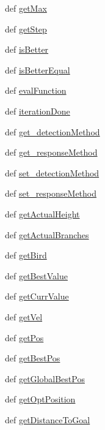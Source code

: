 \begin{CompactItemize}
\item 
def \hyperlink{classpso_1_1PSO_c0a0b2d00975cc0c7c3a0ade010a0dfb}{getMax}
\item 
def \hyperlink{classpso_1_1PSO_fa63468339a1f1b61bb08fdac78533c8}{getStep}
\item 
def \hyperlink{classpso_1_1PSO_720426c56c3c40a7aeb7025a9139742f}{isBetter}
\item 
def \hyperlink{classpso_1_1PSO_3c529903fe714d9e6c5fe0f8d31891ac}{isBetterEqual}
\item 
def \hyperlink{classpso_1_1PSO_43d5c6fb841788547e854e96785c4556}{evalFunction}
\item 
def \hyperlink{classpso_1_1PSO_a24e4aaf3ed6ca00076bb4b979cc402a}{iterationDone}
\item 
def \hyperlink{classpso_1_1PSO_9aa3d6d58e2708d1c386c8d23815df73}{get\_\-detectionMethod}
\item 
def \hyperlink{classpso_1_1PSO_5fd90d626508d95f3107b18bb8fcd74b}{get\_\-responseMethod}
\item 
def \hyperlink{classpso_1_1PSO_a52221e5c0a07f576c23d24e919728f0}{set\_\-detectionMethod}
\item 
def \hyperlink{classpso_1_1PSO_a30ae4a539fe234a01551a6fadf8d4db}{set\_\-responseMethod}
\item 
def \hyperlink{classpso_1_1PSO_120d43d6fba4ef105bd4b3e8e969fa0a}{getActualHeight}
\item 
def \hyperlink{classpso_1_1PSO_f8dad982de4756ca78f1fa0f9bd7d8be}{getActualBranches}
\item 
def \hyperlink{classpso_1_1PSO_c0c92d741834bd8d33699cbfa391070b}{getBird}
\item 
def \hyperlink{classpso_1_1PSO_74050ae6d8a79f094c1b6025fa0a7f9e}{getBestValue}
\item 
def \hyperlink{classpso_1_1PSO_024f1748ae3382e0546a48ca2a1fc892}{getCurrValue}
\item 
def \hyperlink{classpso_1_1PSO_fdf044cb33b396058d87171b5649d92a}{getVel}
\item 
def \hyperlink{classpso_1_1PSO_b139cc7628c1713ce1cd6439901ffa74}{getPos}
\item 
def \hyperlink{classpso_1_1PSO_dbe4e2fad4bd04a2c59c2ef7f133cb57}{getBestPos}
\item 
def \hyperlink{classpso_1_1PSO_5df045224e53f634b4e204b8b83d6576}{getGlobalBestPos}
\item 
def \hyperlink{classpso_1_1PSO_4d3f2834183f52a5dc71107553949578}{getOptPosition}
\item 
def \hyperlink{classpso_1_1PSO_06f5a877e782a6246668fe06b6ad4ebd}{getDistanceToGoal}

\end{CompactItemize}
